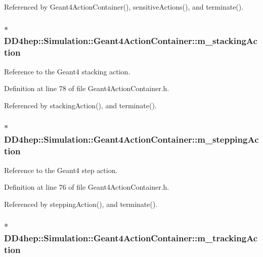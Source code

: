 Referenced by Geant4ActionContainer(), sensitiveActions(), and terminate().\hypertarget{class_d_d4hep_1_1_simulation_1_1_geant4_action_container_a2fafe23afaf2000c04de123052b7e785}{
\subsubsection[{m\_\-stackingAction}]{$\ast$ {\bf DD4hep::Simulation::Geant4ActionContainer::m\_\-stackingAction}}}
\label{class_d_d4hep_1_1_simulation_1_1_geant4_action_container_a2fafe23afaf2000c04de123052b7e785}


Reference to the Geant4 stacking action. 

Definition at line 78 of file Geant4ActionContainer.h.

Referenced by stackingAction(), and terminate().\hypertarget{class_d_d4hep_1_1_simulation_1_1_geant4_action_container_a45d1b85f3238c5658fef9a0170c40ae1}{
\subsubsection[{m\_\-steppingAction}]{$\ast$ {\bf DD4hep::Simulation::Geant4ActionContainer::m\_\-steppingAction}}}
\label{class_d_d4hep_1_1_simulation_1_1_geant4_action_container_a45d1b85f3238c5658fef9a0170c40ae1}


Reference to the Geant4 step action. 

Definition at line 76 of file Geant4ActionContainer.h.

Referenced by steppingAction(), and terminate().\hypertarget{class_d_d4hep_1_1_simulation_1_1_geant4_action_container_a5a39104d6cb2d3d0c578ddb50fbb988b}{
\subsubsection[{m\_\-trackingAction}]{$\ast$ {\bf DD4hep::Simulation::Geant4ActionContainer::m\_\-trackingAction}}}
\label{class_d_d4hep_1_1_simulation_1_1_geant4_action_container_a5a39104d6cb2d3d0c578ddb50fbb988b}


